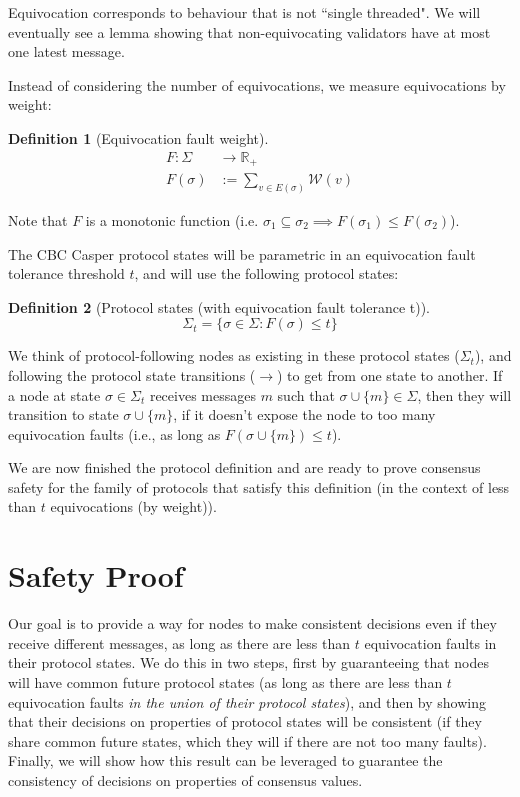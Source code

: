 \documentclass{article}
\theoremstyle{definition}
\newtheorem{defn}{Definition}[section]
\begin{document}
Equivocation corresponds to behaviour that is not ``single threaded". We will eventually see a lemma showing that non-equivocating validators have at most one latest message.

Instead of considering the number of equivocations, we measure equivocations by weight:

\begin{defn}[Equivocation fault weight]
\begin{align}
F: \Sigma &\to \mathbb{R}_+ \\
F(\sigma) &:= \sum_{v \in E(\sigma)} \mathcal{W}(v)
\end{align}
\end{defn}

Note that $F$ is a monotonic function (i.e. $\sigma_1 \subseteq \sigma_2 \implies F(\sigma_1) \leq F(\sigma_2)$).

The CBC Casper protocol states will be parametric in an equivocation fault tolerance threshold $t$, and will use the following protocol states:

\begin{defn}[Protocol states (with equivocation fault tolerance t)]
$$
\Sigma_t = \{\sigma \in \Sigma : F(\sigma) \leq t\}
$$
\end{defn}

We think of protocol-following nodes as existing in these protocol states ($\Sigma_t$), and following the protocol state transitions ($\to$) to get from one state to another. If a node at state $\sigma \in \Sigma_t$ receives messages $m$ such that $\sigma \cup \{m\} \in \Sigma$, then they will transition to state $\sigma \cup \{m\}$, if it doesn't expose the node to too many equivocation faults (i.e., as long as $F(\sigma \cup \{m\}) \leq t$).

We are now finished the protocol definition and are ready to prove consensus safety for the family of protocols that satisfy this definition (in the context of less than $t$ equivocations (by weight)).


\pagebreak
\section{Safety Proof}

Our goal is to provide a way for nodes to make consistent decisions even if they receive different messages, as long as there are less than $t$ equivocation faults in their protocol states. We do this in two steps, first by guaranteeing that nodes will have common future protocol states (as long as there are less than $t$ equivocation faults \emph{in the union of their protocol states}), and then by showing that their decisions on properties of protocol states will be consistent (if they share common future states, which they will if there are not too many faults). Finally, we will show how this result can be leveraged to guarantee the consistency of decisions on properties of consensus values.
\end{document}
